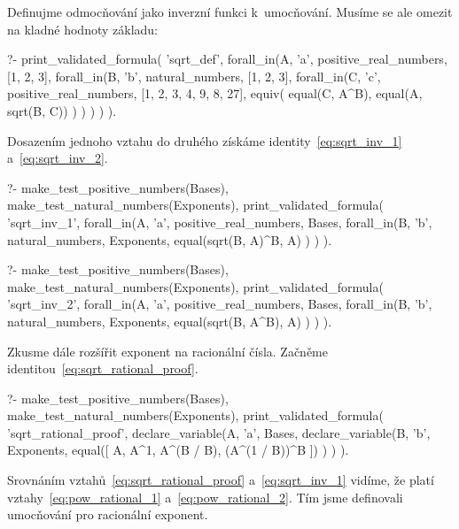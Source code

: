 Definujme odmocňování jako inverzní funkci k~umocňování. Musíme se ale omezit na kladné hodnoty základu:

\begin{prolog}
?-	print_validated_formula(
		'sqrt_def',
		forall_in(A, 'a', positive_real_numbers, [1, 2, 3],
			forall_in(B, 'b', natural_numbers, [1, 2, 3],
				forall_in(C, 'c', positive_real_numbers, [1, 2, 3, 4, 9, 8, 27],
					equiv(
						equal(C, A^B),
						equal(A, sqrt(B, C))
					)
				)
			)
		)
	).				
\end{prolog}

Dosazením jednoho vztahu do druhého získáme identity~\eqref{eq:sqrt_inv_1} a~\eqref{eq:sqrt_inv_2}.

\begin{prolog}
?-	make_test_positive_numbers(Bases),
	make_test_natural_numbers(Exponents),
	print_validated_formula(
		'sqrt_inv_1',
		forall_in(A, 'a', positive_real_numbers, Bases,
			forall_in(B, 'b', natural_numbers, Exponents,
				equal(sqrt(B, A)^B, A)
			)
		)
	).				
\end{prolog}
\begin{prolog}
?-	make_test_positive_numbers(Bases),
	make_test_natural_numbers(Exponents),
	print_validated_formula(
		'sqrt_inv_2',
		forall_in(A, 'a', positive_real_numbers, Bases,
			forall_in(B, 'b', natural_numbers, Exponents,
				equal(sqrt(B, A^B), A)
			)
		)
	).				
\end{prolog}

Zkusme dále rozšířit exponent na racionální čísla. Začněme identitou~\eqref{eq:sqrt_rational_proof}.

\begin{prolog}
?-	make_test_positive_numbers(Bases),
	make_test_natural_numbers(Exponents),
	print_validated_formula(
		'sqrt_rational_proof',
		declare_variable(A, 'a', Bases,
			declare_variable(B, 'b', Exponents,
				equal([
					A,
					A^1,
					A^(B / B),
					(A^(1 / B))^B
				])
			)
		)
	).				
\end{prolog}

Srovnáním vztahů~\eqref{eq:sqrt_rational_proof} a~\eqref{eq:sqrt_inv_1} vidíme, že platí vztahy~\eqref{eq:pow_rational_1} a~\eqref{eq:pow_rational_2}. Tím jsme definovali umocňování pro racionální exponent.

